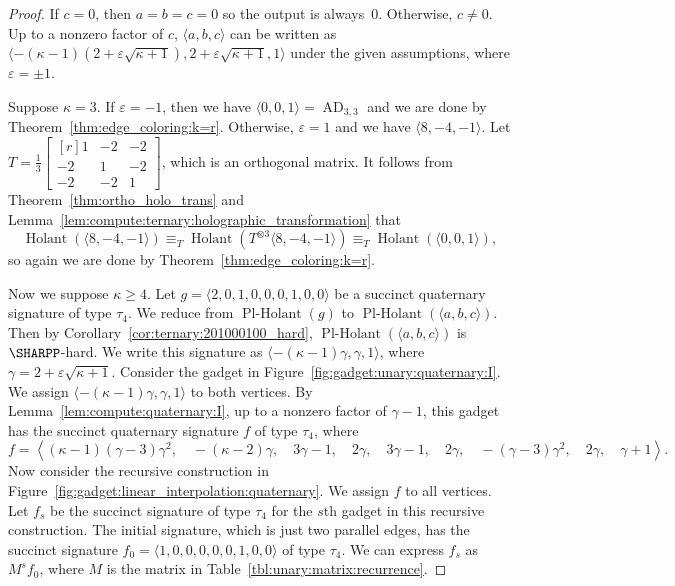 \documentclass[11pt]{article}
\newcommand{\Holant}{\operatorname{Holant}}
\newcommand{\PlHolant}{\operatorname{Pl-Holant}}
\newcommand{\AD}{\operatorname{AD}}
\begin{document}
\begin{proof}
 If $c = 0$,
 then $a = b = c = 0$ so the output is always~$0$.
 Otherwise, $c \ne 0$.
 Up to a nonzero factor of $c$,
 $\langle a,b,c \rangle$ can be written as $\langle -(\kappa - 1) (2 + \varepsilon \sqrt{\kappa + 1}), 2 + \varepsilon \sqrt{\kappa + 1}, 1 \rangle$ under the given assumptions,
 where $\varepsilon = \pm 1$.
 
 Suppose $\kappa = 3$.
 If $\varepsilon = -1$,
 then we have $\langle 0,0,1 \rangle = \AD_{3,3}$ and we are done by Theorem~\ref{thm:edge_coloring:k=r}.
 Otherwise, $\varepsilon = 1$ and we have $\langle 8,-4,-1 \rangle$.
 Let $T = \frac{1}{3} \left[\begin{smallmatrix*}[r] 1 & -2 & -2 \\ -2 & 1 & -2 \\ -2 & -2 & 1 \end{smallmatrix*}\right]$,
 which is an orthogonal matrix.
 It follows from Theorem~\ref{thm:ortho_holo_trans} and Lemma~\ref{lem:compute:ternary:holographic_transformation} that
 \[
  \Holant(\langle 8,-4,-1 \rangle)
  \equiv_T \Holant(T^{\otimes 3} \langle 8,-4,-1 \rangle)
  \equiv_T \Holant(\langle 0,0,1 \rangle),
 \]
  so again we are done by Theorem~\ref{thm:edge_coloring:k=r}.
 
 Now we suppose $\kappa \ge 4$.
 Let $g = \langle 2,0,1,0,0,0,1,0,0 \rangle$ be a succinct quaternary signature of type $\tau_4$.
 We reduce from $\PlHolant(g)$ to $\PlHolant(\langle a,b,c \rangle)$.
 Then by Corollary~\ref{cor:ternary:201000100_hard},
 $\PlHolant(\langle a,b,c \rangle)$ is $\SHARPP$-hard.
 We write this signature as $\langle -(\kappa - 1) \gamma, \gamma, 1 \rangle$,
 where $\gamma = 2 + \varepsilon \sqrt{\kappa + 1}$.
 Consider the gadget in Figure~\ref{fig:gadget:unary:quaternary:I}.
 We assign $\langle -(\kappa - 1) \gamma, \gamma, 1 \rangle$ to both vertices.
 By Lemma~\ref{lem:compute:quaternary:I},
 up to a nonzero factor of $\gamma - 1$,
 this gadget has the succinct quaternary signature $f$ of type $\tau_4$,
 where
 \[
 f =
  \left\langle
   (\kappa - 1) (\gamma - 3) \gamma^2,\quad
   -(\kappa - 2) \gamma,\quad
   3 \gamma - 1,\quad
   2 \gamma,\quad
   3 \gamma - 1,\quad
   2 \gamma,\quad
   -(\gamma - 3) \gamma^2,\quad
   2 \gamma,\quad
   \gamma + 1
  \right\rangle.
 \]
 Now consider the recursive construction in Figure~\ref{fig:gadget:linear_interpolation:quaternary}.
 We assign $f$ to all vertices.
 Let $f_s$ be the succinct signature of type $\tau_4$ for the $s$th gadget in this recursive construction.
 The initial signature,
 which is just two parallel edges,
 has the succinct signature $f_0 = \langle 1,0,0,0,0,0,1,0,0 \rangle$ of type $\tau_4$.
 We can express $f_s$ as $M^s f_0$,
 where $M$ is the matrix in Table~\ref{tbl:unary:matrix:recurrence}.
 

\end{proof}
\end{document}
